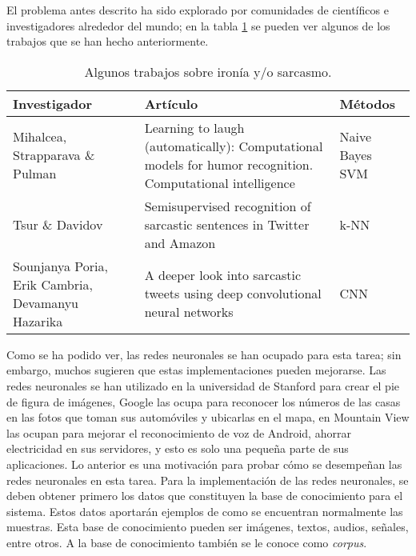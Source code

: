 \par El problema antes descrito ha sido explorado por comunidades de científicos e investigadores alrededor del mundo; en la tabla \ref{table:AlgunosTrabajos} se pueden ver algunos de los trabajos que se han hecho anteriormente.
\begin{table}[h]
	\centering
	\caption{Algunos trabajos sobre ironía y/o sarcasmo.}
	\begin{tabular} {|p{3cm}|p{6cm}|p{2cm}| }
		\hline
		Investigador                                   & Artículo                                                                                                   & Métodos         \\[0.5ex]
		\hline
		Mihalcea, Strapparava \& Pulman                   & Learning to laugh (automatically): Computational models for humor recognition.  Computational intelligence & Naive Bayes SVM \\
		\hline
		Tsur \& Davidov                                   & Semisupervised recognition of sarcastic sentences in Twitter and Amazon                                    & k-NN            \\
		\hline
		Sounjanya Poria, Erik Cambria, Devamanyu Hazarika & A deeper look into sarcastic tweets using deep convolutional neural networks                               & CNN             \\[1 ex]
		\hline
	\end{tabular}
	\label{table:AlgunosTrabajos}
\end{table}

\par Como se ha podido ver, las redes neuronales se han ocupado para esta tarea; sin embargo, muchos sugieren que estas implementaciones pueden mejorarse. Las redes neuronales se han utilizado en la universidad de Stanford para crear el pie de figura de imágenes, Google las ocupa para reconocer los números de las casas en las fotos que toman sus automóviles y ubicarlas en el mapa, en Mountain View las ocupan para mejorar el reconocimiento de voz de  Android, ahorrar electricidad en sus servidores, y esto es solo una pequeña parte de sus aplicaciones. Lo anterior es una motivación para probar cómo se desempeñan las redes neuronales en esta tarea. Para la implementación de las redes neuronales, se deben obtener primero los datos que constituyen la base de conocimiento para el sistema. Estos datos aportarán ejemplos de como se encuentran normalmente las muestras. Esta base de conocimiento pueden ser imágenes, textos, audios, señales, entre otros. A la base de conocimiento también se le conoce como \textit{corpus}.

